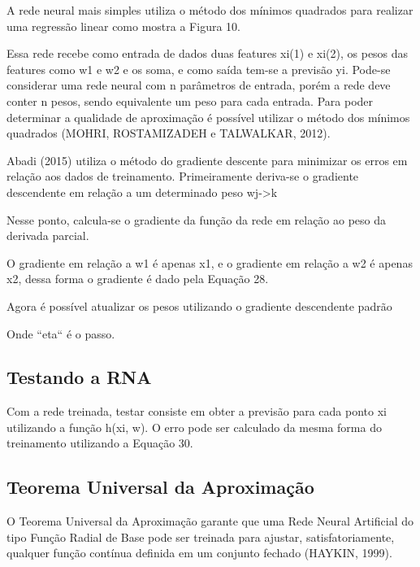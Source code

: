 A rede neural mais simples utiliza o método dos mínimos quadrados para realizar uma regressão linear como mostra a Figura 10. 

Essa rede recebe como entrada de dados duas features xi(1) e xi(2), os pesos das features como w1 e w2 e os soma, e como saída tem-se a previsão yi. Pode-se considerar uma rede neural com n parâmetros de entrada, porém a rede deve conter n pesos, sendo equivalente um peso para cada entrada. Para poder determinar a qualidade de aproximação é possível utilizar o método dos mínimos quadrados (MOHRI, ROSTAMIZADEH e TALWALKAR, 2012).

Abadi (2015) utiliza o método do gradiente descente para minimizar os erros em relação aos dados de treinamento. Primeiramente deriva-se o gradiente descendente em relação a um determinado peso wj->k

Nesse ponto, calcula-se o gradiente da função da rede em relação ao peso da derivada parcial. 

O gradiente em relação a w1 é apenas x1, e o gradiente em relação a w2 é apenas x2, dessa forma o gradiente é dado pela Equação 28.

Agora é possível atualizar os pesos utilizando o gradiente descendente padrão

Onde ``eta`` é o passo.

\subsection{Testando a RNA}

Com a rede treinada, testar consiste em obter a previsão para cada ponto xi utilizando a função h(xi, w). O erro pode ser calculado da mesma forma do treinamento utilizando a Equação 30.

\subsection{Teorema Universal da Aproximação}

O Teorema Universal da Aproximação garante que uma Rede Neural Artificial do tipo Função Radial de Base pode ser treinada para ajustar, satisfatoriamente, qualquer função contínua definida em um conjunto fechado (HAYKIN, 1999).